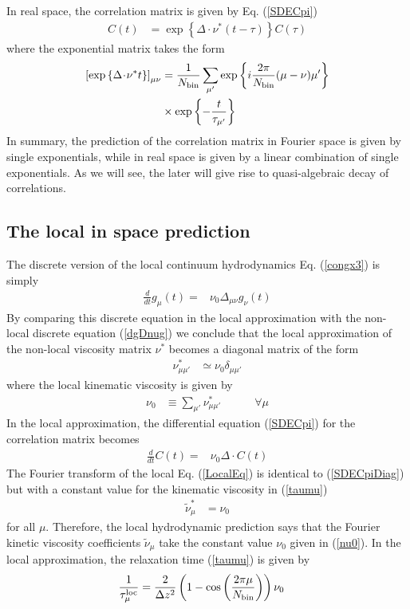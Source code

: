 \documentclass[a4paper,openright,12pt]{book}
\newcommand{\esc}{\!\cdot\!}
\begin{document}
In real space, the correlation matrix is given by Eq. (\ref{SDECpi})
\begin{align}
  C(t)&=\exp\left\{\Delta\esc \nu^* (t-\tau) \right\}C(\tau)
\label{Cmunut}
\end{align}
where the exponential matrix takes the form
\begin{align}
\left[\exp\left\{\Delta\esc \nu^* t \right\}\right]_{\mu\nu}
&=\frac{1}{N_{\rm bin}}\sum_{\mu'}\exp\left\{i\frac{2\pi}{N_{\rm bin}}(\mu-\nu)\mu'\right\}
\nonumber\\
&\times
\exp\left\{-\frac{t}{\tau_{\mu'}}\right\}
\end{align}
In summary, the prediction of the correlation matrix in Fourier space
is given  by single exponentials, while  in real space is  given by a
linear combination of  single exponentials. As we will  see, the later
will give rise to quasi-algebraic decay of correlations.

\subsection{The local in space prediction}
The   discrete   version   of  the   local   continuum   hydrodynamics
Eq. (\ref{congx3}) is simply
\begin{align}
  \frac{d}{dt}{g}_\mu(t)=&\nu_0\Delta_{\mu\nu}{g}_\nu(t)
\label{gloc}
\end{align}
By comparing  this discrete equation  in the local  approximation with
the non-local  discrete equation  (\ref{dgDnug}) we conclude  that the
local approximation of the non-local viscosity matrix $\nu^*$ becomes a
diagonal matrix of the form
\begin{align}
\nu_{\mu\mu'}^*&\simeq \nu_0 \delta_{\mu\mu'}
\end{align}
where the local kinematic viscosity is given by
\begin{align}
\nu_0&\equiv \sum_{\mu'}\nu_{\mu\mu'}^* \quad \quad \quad\forall \mu
\label{nu0}
\end{align}
In the  local approximation, the differential  equation (\ref{SDECpi})
for the correlation matrix becomes
\begin{align}
  \frac{d}{dt}{C}(t)=&\nu_0{\Delta}\esc { C}(t)
\label{LocalEq}
\end{align}
The Fourier transform of the local Eq. (\ref{LocalEq}) is identical to
(\ref{SDECpiDiag})  but  with  a  constant  value  for  the  kinematic
viscosity in (\ref{taumu})
\begin{align}
\tilde{\nu}^*_\mu&= \nu_0
\label{numunu0}
\end{align}
for all $\mu$. Therefore, the  local hydrodynamic prediction says that
the Fourier kinetic viscosity  coefficients $\tilde{\nu}_\mu$ take the
constant value $\nu_0$ given in (\ref{nu0}).
In the local approximation, the relaxation time (\ref{taumu}) is given by 
\begin{align}
 \frac{1}{\tau^{\rm loc}_\mu}&=\frac{2}{\Delta z^2}
\left(1-\cos\left( \frac{2\pi \mu}{N_{\rm bin}}\right)\right)
\nu_0
\label{taumuloc}
\end{align}
\end{document}
